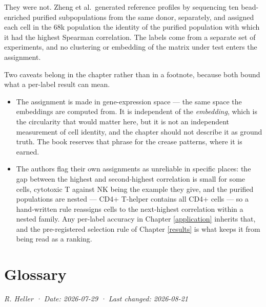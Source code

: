 \documentclass[
  british,
  a4paper,
]{book}
\providecommand{\tightlist}{%
  \setlength{\itemsep}{0pt}\setlength{\parskip}{0pt}}
\begin{document}
They were not. Zheng et al.~generated reference profiles by sequencing ten
bead-enriched purified subpopulations from the same donor, separately, and
assigned each cell in the 68k population the identity of the purified
population with which it had the highest Spearman correlation. The labels come
from a separate set of experiments, and no clustering or embedding of the
matrix under test enters the assignment.

Two caveats belong in the chapter rather than in a footnote, because both bound
what a per-label result can mean.

\begin{itemize}
\tightlist
\item
  The assignment is made in gene-expression space --- the same space the
  embeddings are computed from. It is independent of the \emph{embedding}, which is
  the circularity that would matter here, but it is not an independent
  measurement of cell identity, and the chapter should not describe it as
  ground truth. The book reserves that phrase for the crease patterns, where it
  is earned.
\item
  The authors flag their own assignments as unreliable in specific places: the
  gap between the highest and second-highest correlation is small for some
  cells, cytotoxic T against NK being the example they give, and the purified
  populations are nested --- CD4+ T-helper contains all CD4+ cells --- so a
  hand-written rule reassigns cells to the next-highest correlation within a
  nested family. Any per-label accuracy in Chapter \ref{application} inherits
  that, and the pre-registered selection rule of Chapter \ref{results} is what
  keeps it from being read as a ranking.
\end{itemize}

\chapter*{Glossary}\label{glossary}

\emph{R. Heller · Date: 2026-07-29 · Last changed: 2026-08-21}
\end{document}
